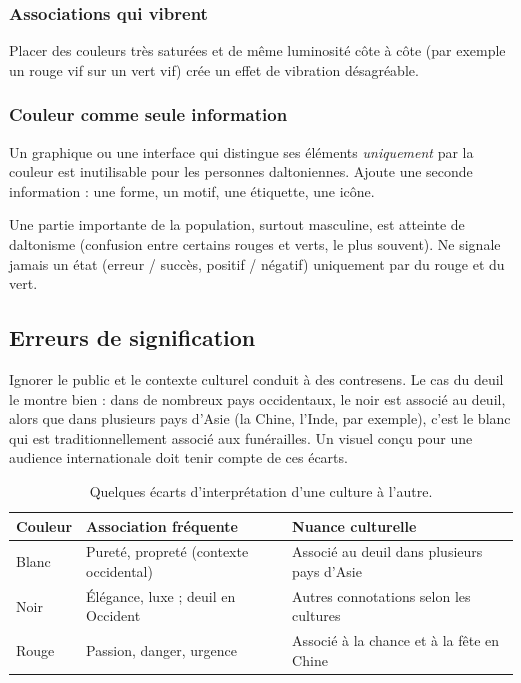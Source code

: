 \subsubsection{Associations qui vibrent}

Placer des couleurs très saturées et de même luminosité côte à côte (par exemple un rouge vif sur un vert vif) crée un effet de vibration désagréable.

\subsubsection{Couleur comme seule information}

Un graphique ou une interface qui distingue ses éléments \emph{uniquement} par la couleur est inutilisable pour les personnes daltoniennes. Ajoute une seconde information : une forme, un motif, une étiquette, une icône.

\begin{erreur}
Une partie importante de la population, surtout masculine, est atteinte de daltonisme (confusion entre certains rouges et verts, le plus souvent). Ne signale jamais un état (erreur / succès, positif / négatif) uniquement par du rouge et du vert.
\end{erreur}

\subsection{Erreurs de signification}

Ignorer le public et le contexte culturel conduit à des contresens. Le cas du deuil le montre bien : dans de nombreux pays occidentaux, le noir est associé au deuil, alors que dans plusieurs pays d'Asie (la Chine, l'Inde, par exemple), c'est le blanc qui est traditionnellement associé aux funérailles. Un visuel conçu pour une audience internationale doit tenir compte de ces écarts.

\begin{table}[h!]
\centering
\begin{tabular}{@{}p{2.4cm}p{6cm}p{6cm}@{}}
\toprule
\textbf{Couleur} & \textbf{Association fréquente} & \textbf{Nuance culturelle} \\
\midrule
Blanc & Pureté, propreté (contexte occidental) & Associé au deuil dans plusieurs pays d'Asie \\
Noir & Élégance, luxe ; deuil en Occident & Autres connotations selon les cultures \\
Rouge & Passion, danger, urgence & Associé à la chance et à la fête en Chine \\
\bottomrule
\end{tabular}
\caption{Quelques écarts d'interprétation d'une culture à l'autre.}
\end{table}

